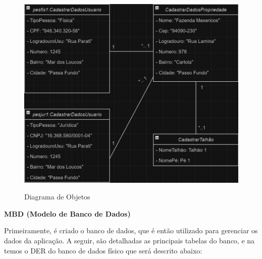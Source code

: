 \begin{figure}[H]
    \centering
    \caption{Diagrama de Objetos}
    \includegraphics[width=0.7\linewidth]{Illustrations/diagramaObjetos.png}
    \label{fig:diagrama-objetos}
    \end{figure}

\textbf{MBD (Modelo de Banco de Dados)}

Primeiramente, é criado o banco de dados, que é então utilizado para gerenciar os dados da aplicação. A seguir, são detalhadas as principais tabelas do banco, e na  temos o DER do banco de dados físico que será descrito abaixo:

